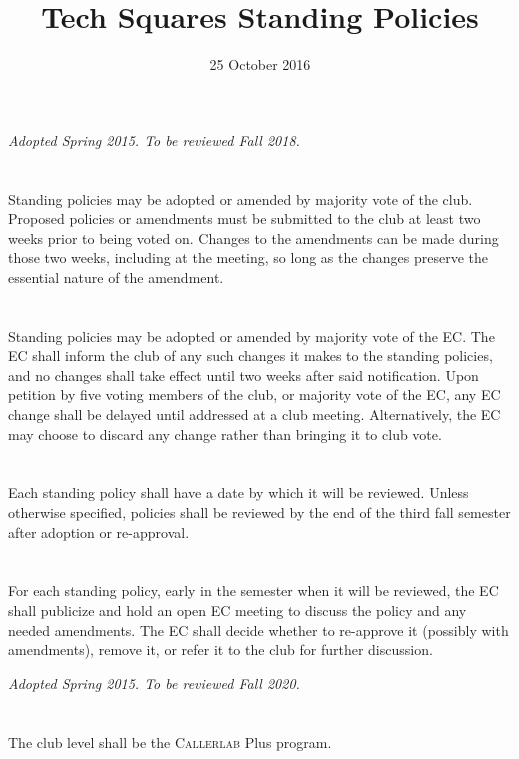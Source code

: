 \documentclass{bylaws}
\title{Tech Squares Standing Policies}
\date{25 October 2016}
\newcommand{\sptimes}[2]{\emph{Adopted #1. To be reviewed #2.}}
\begin{document}
\maketitle

\label{pol:adopt}
\sptimes{Spring 2015}{Fall 2018}
\section{}Standing policies may be adopted or amended by majority vote of the club. Proposed policies or amendments must be submitted to the club at least two weeks prior to being voted on. Changes to the amendments can be made during those two weeks, including at the meeting, so long as the changes preserve the essential nature of the amendment.
\section{}Standing policies may be adopted or amended by majority vote of the EC. The EC shall inform the club of any such changes it makes to the standing policies, and no changes shall take effect until two weeks after said notification. Upon petition by five voting members of the club, or majority vote of the EC, any EC change shall be delayed until addressed at a club meeting. Alternatively, the EC may choose to discard any change rather than bringing it to club vote.
\section{}Each standing policy shall have a date by which it will be reviewed. Unless otherwise specified, policies shall be reviewed by the end of the third fall semester after adoption or re-approval.
\section{}For each standing policy, early in the semester when it will be reviewed, the EC shall publicize and hold an open EC meeting to discuss the policy and any needed amendments. The EC shall decide whether to re-approve it (possibly with amendments), remove it, or refer it to the club for further discussion.


\sptimes{Spring 2015}{Fall 2020}
\section{}The club level shall be the \textsc{Callerlab} Plus program.
\end{document}
